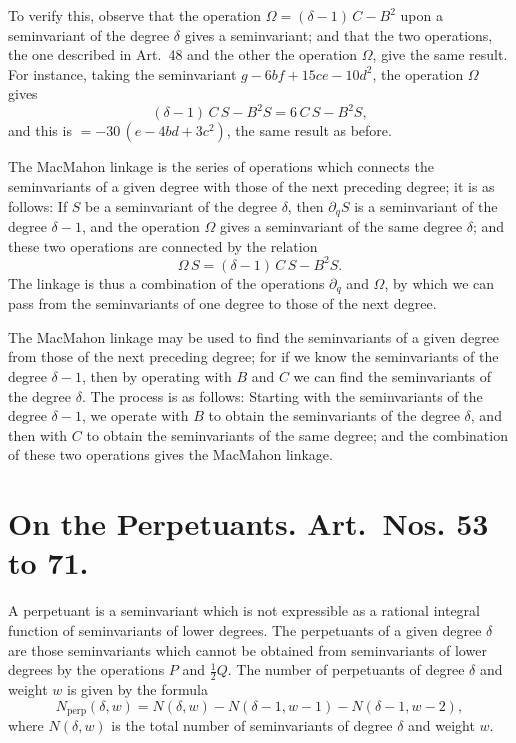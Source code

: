 \documentclass[11pt,a4paper]{book}
\begin{document}
{{{\setcounter{art}{50}
\begin{art}
To verify this, observe that the operation $\Omega = (\delta - 1)\,C - B^{2}$ upon a seminvariant of the degree $\delta$ gives a seminvariant; and that the two operations, the one described in Art.~48 and the other the operation $\Omega$, give the same result. For instance, taking the seminvariant $g - 6bf + 15ce - 10d^{2}$, the operation $\Omega$ gives
\[
(\delta - 1)\,C\,S - B^{2}S = 6\,C\,S - B^{2}S,
\]
and this is $= -30\,(e - 4bd + 3c^{2})$, the same result as before.
\end{art}

\setcounter{art}{51}
\begin{art}
The MacMahon linkage is the series of operations which connects the seminvariants of a given degree with those of the next preceding degree; it is as follows: If $S$ be a seminvariant of the degree $\delta$, then $\partial_{q}S$ is a seminvariant of the degree $\delta - 1$, and the operation $\Omega$ gives a seminvariant of the same degree $\delta$; and these two operations are connected by the relation
\[
\Omega\,S = (\delta - 1)\,C\,S - B^{2}S.
\]
The linkage is thus a combination of the operations $\partial_{q}$ and $\Omega$, by which we can pass from the seminvariants of one degree to those of the next degree.
\end{art}

\setcounter{art}{52}
\begin{art}
The MacMahon linkage may be used to find the seminvariants of a given degree from those of the next preceding degree; for if we know the seminvariants of the degree $\delta - 1$, then by operating with $B$ and $C$ we can find the seminvariants of the degree $\delta$. The process is as follows: Starting with the seminvariants of the degree $\delta - 1$, we operate with $B$ to obtain the seminvariants of the degree $\delta$, and then with $C$ to obtain the seminvariants of the same degree; and the combination of these two operations gives the MacMahon linkage.
\end{art}

\section*{On the Perpetuants. Art.~Nos. \textbf{53} to \textbf{71}.}

\setcounter{art}{52}
\begin{art}
A perpetuant is a seminvariant which is not expressible as a rational integral function of seminvariants of lower degrees. The perpetuants of a given degree $\delta$ are those seminvariants which cannot be obtained from seminvariants of lower degrees by the operations $P$ and $\frac{1}{2}Q$. The number of perpetuants of degree $\delta$ and weight $w$ is given by the formula
\[
N_{\text{perp}}(\delta, w) = N(\delta, w) - N(\delta - 1, w - 1) - N(\delta - 1, w - 2),
\]
where $N(\delta, w)$ is the total number of seminvariants of degree $\delta$ and weight $w$.
\end{art}

}}}
\end{document}
